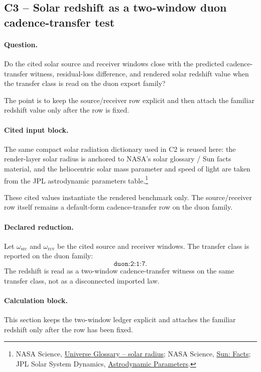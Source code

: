 \subsection{C3 -- Solar redshift as a two-window duon cadence-transfer test}\label{suppc:c3-solar-redshift}
\paragraph{Question.} Do the cited solar source and receiver windows close with the predicted cadence-transfer witness, residual-loss difference, and rendered solar redshift value when the transfer class is read on the duon export family?

The point is to keep the source/receiver row explicit and then attach the familiar redshift value only after the row is fixed.

\paragraph{Cited input block.} The same compact solar radiation dictionary used in C2 is reused here: the render-layer solar radius is anchored to NASA's solar glossary / Sun facts material, and the heliocentric solar mass parameter and speed of light are taken from the JPL astrodynamic parameters table.\footnote{NASA Science, \href{https://science.nasa.gov/universe/glossary/}{Universe Glossary -- solar radius}; NASA Science, \href{https://science.nasa.gov/sun/facts/}{Sun: Facts}; JPL Solar System Dynamics, \href{https://ssd.jpl.nasa.gov/astro_par.html}{Astrodynamic Parameters}.}

These cited values instantiate the rendered benchmark only. The source/receiver row itself remains a default-form cadence-transfer row on the duon family.

\paragraph{Declared reduction.} Let $\omega_{\mathrm{src}}$ and $\omega_{\mathrm{rcv}}$ be the cited source and receiver windows. The transfer class is reported on the duon family:
\[
\texttt{duon:2:1:7}.
\]
The redshift is read as a two-window cadence-transfer witness on the same transfer class, not as a disconnected imported law.

\paragraph{Calculation block.} This section keeps the two-window ledger explicit and attaches the familiar redshift only after the row has been fixed.

